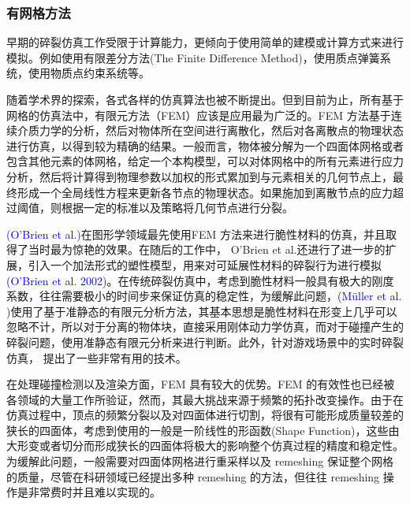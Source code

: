 \subsubsection{有网格方法}

早期的碎裂仿真工作受限于计算能力，更倾向于使用简单的建模或计算方式来进行模拟。例如使用有限差分方法(The Finite Difference Method)，使用质点弹簧系统，使用物质点约束系统等。

随着学术界的探索，各式各样的仿真算法也被不断提出。但到目前为止，所有基于网格的仿真法中，有限元方法（FEM）应该是应用最为广泛的。FEM 方法基于连续介质力学的分析，然后对物体所在空间进行离散化，然后对各离散点的物理状态进行仿真，以得到较为精确的结果。一般而言，物体被分解为一个四面体网格或者包含其他元素的体网格，给定一个本构模型，可以对体网格中的所有元素进行应力分析，然后将计算得到物理参数以加权的形式累加到与元素相关的几何节点上，最终形成一个全局线性方程来更新各节点的物理状态。如果施加到离散节点的应力超过阈值，则根据一定的标准以及策略将几何节点进行分裂。

\textcolor{blue}{(O'Brien et al.)\parencite{OBrien1999}}在图形学领域最先使用FEM 方法来进行脆性材料的仿真，并且取得了当时最为惊艳的效果。在随后的工作中， O'Brien et al.还进行了进一步的扩展，引入一个加法形式的塑性模型，用来对可延展性材料的碎裂行为进行模拟\textcolor{blue}{(O'Brien et al. 2002)\parencite{OBrien2002}}。在传统碎裂仿真中，考虑到脆性材料一般具有极大的刚度系数，往往需要极小的时间步来保证仿真的稳定性，为缓解此问题，\textcolor{blue}{(M\"{u}ller et al. )\parencite{Muller2001}}使用了基于准静态的有限元分析方法，其基本思想是脆性材料在形变上几乎可以忽略不计，所以对于分离的物体块，直接采用刚体动力学仿真，而对于碰撞产生的碎裂问题，使用准静态有限元分析来进行判断。此外，针对游戏场景中的实时碎裂仿真， 提出了一些非常有用的技术。

在处理碰撞检测以及渲染方面，FEM 具有较大的优势。FEM 的有效性也已经被各领域的大量工作所验证，然而，其最大挑战来源于频繁的拓扑改变操作。由于在仿真过程中，顶点的频繁分裂以及对四面体进行切割，将很有可能形成质量较差的狭长的四面体，考虑到使用的一般是一阶线性的形函数(Shape Function)，这些由大形变或者切分而形成狭长的四面体将极大的影响整个仿真过程的精度和稳定性。为缓解此问题，一般需要对四面体网格进行重采样以及 remeshing 保证整个网格的质量，尽管在科研领域已经提出多种 remeshing 的方法，但往往 remeshing 操作是非常费时并且难以实现的。

